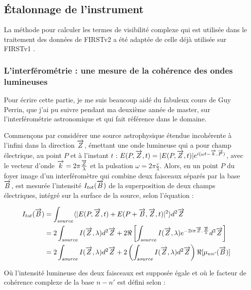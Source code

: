 \subsection{Étalonnage de l'instrument}

La méthode pour calculer les termes de visibilité complexe qui est utilisée dans le traitement des données de \ac{FIRSTv2} a été adaptée de celle déjà utilisée sur \ac{FIRSTv1} \citep{huby2012, huby2013these, vievard2022}.

\subsubsection{L'interférométrie : une mesure de la cohérence des ondes lumineuses}

Pour écrire cette partie, je me suis beaucoup aidé du fabuleux cours de Guy Perrin, que j'ai pu suivre pendant ma deuxième année de master, sur l'interférométrie astronomique et qui fait référence dans le domaine.

Commençons par considérer une source astrophysique étendue incohérente à l'infini dans la direction $\overrightarrow{Z}$, émettant une onde lumineuse qui a pour champ électrique, au point $P$ et à l'instant $t$ : $E(P,\overrightarrow{Z},t) = |E(P,\overrightarrow{Z},t)| e^{i(\omega t - \overrightarrow{k}.\overrightarrow{P})}$, avec le vecteur d'onde $\overrightarrow{k} = 2\pi \frac{\overrightarrow{Z}}{\lambda}$ et la pulsation $\omega = 2\pi \frac{c}{\lambda}$. Alors, en un point $P$ du foyer image d'un interféromètre qui combine deux faisceaux séparés par la base $\overrightarrow{B}$, est mesurée l'intensité $I_{tot}(\overrightarrow{B})$ de la superposition de deux champs électriques, intégré sur la surface de la source, selon l'équation :

\begin{align}
	I_{tot}(\overrightarrow{B}) &= \int_{source} \langle | E(P,\overrightarrow{Z},t) + E(P+\overrightarrow{B},\overrightarrow{Z},t) |^2 \rangle d^2\overrightarrow{Z} \label{eq:Interferogramme1} \\
	&= 2 \int_{source} I(\overrightarrow{Z},\lambda) d^2\overrightarrow{Z} + 2 \Re \left[\int_{source} I(\overrightarrow{Z},\lambda) e^{-2i\pi \overrightarrow{Z}.\frac{\overrightarrow{B}}{\lambda}} d^2\overrightarrow{Z} \right] \\
	&= 2 \int_{source} I(\overrightarrow{Z},\lambda) d^2\overrightarrow{Z} + 2 \left(\int_{source} I(\overrightarrow{Z},\lambda) d^2\overrightarrow{Z} \right) \Re [\mu_{nn'}(\overrightarrow{B})]
\end{align}

Où l'intensité lumineuse des deux faisceaux est supposée égale et où le facteur de cohérence complexe de la base $n-n'$ est défini selon :

